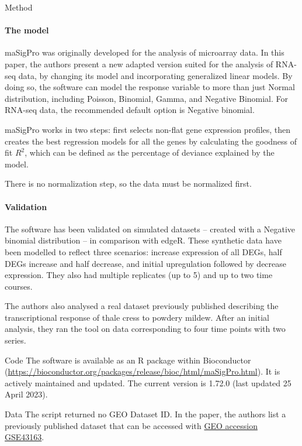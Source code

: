 \documentclass[10pt,a4paper]{article}
\newlength{\templength}
\newenvironment{ann_section}[1]
{\settowidth{\templength}{#1}%
\noindent\textbf{#1}
\hspace{1em}\begin{minipage}[t]{\dimexpr \linewidth-\the\templength-2em}}
{\end{minipage}\par\bigskip}
\begin{document}
\begin{ann_section}{Method}
\paragraph{The model}
maSigPro was originally developed for the analysis of microarray data. In this paper, the authors present a new adapted version suited for the analysis of RNA-seq data, by changing its model and incorporating generalized linear models. By doing so, the software can model the response variable to more than just Normal distribution, including Poisson, Binomial, Gamma, and Negative Binomial. For RNA-seq data, the recommended default option is Negative binomial.

maSigPro works in two steps: first selects non-flat gene expression profiles, then creates the best regression models for all the genes by calculating the goodness of fit $R^2$, which can be defined as the percentage of deviance explained by the model.

There is no normalization step, so the data must be normalized first.

\paragraph{Validation}
The software has been validated on simulated datasets -- created with a Negative binomial distribution -- in comparison with edgeR. These synthetic data have been modelled to reflect three scenarios: increase expression of all DEGs, half DEGs increase and half decrease, and initial upregulation followed by decrease expression. They also had multiple replicates (up to 5) and up to two time courses.

The authors also analysed a real dataset previously published describing the transcriptional response of thale cress to powdery mildew. After an initial analysis, they ran the tool on data corresponding to four time points with two series.
\end{ann_section}

\begin{ann_section}{Code}
The software is available as an R package within Bioconductor (\url{https://bioconductor.org/packages/release/bioc/html/maSigPro.html}). It is actively maintained and updated. The current version is 1.72.0 (last updated 25 April 2023).
\end{ann_section}

\begin{ann_section}{Data}
The script returned no GEO Dataset ID. In the paper, the authors list a previously published dataset that can be accessed with \href{https://www.ncbi.nlm.nih.gov/geo/query/acc.cgi?acc=GSE43163}{GEO accession GSE43163}.
\end{ann_section}
\end{document}
